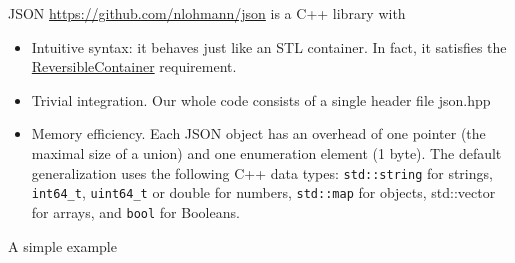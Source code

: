 \documentclass[10pt,aspectratio=169]{beamer}
\begin{document}
\begin{frame}{JSON}
\url{https://github.com/nlohmann/json} is a C++ library with 
\begin{itemize}
    \item Intuitive syntax: it behaves just like an STL container. In fact, it satisfies the \href{https://en.cppreference.com/w/cpp/named_req/ReversibleContainer}{ReversibleContainer} requirement.
    \item Trivial integration. Our whole code consists of a single header file json.hpp
    \item Memory efficiency. Each JSON object has an overhead of one pointer (the maximal size of a union) and one enumeration element (1 byte). The default generalization uses the following C++ data types: \texttt{std::string} for strings, \texttt{int64\_t}, \texttt{uint64\_t} or double for numbers, \texttt{std::map} for objects, std::vector for arrays, and \texttt{bool} for Booleans.
\end{itemize}

\end{frame}

\begin{frame}[fragile]{A simple example}        
    
\end{frame}
\end{document}
